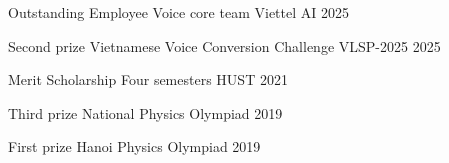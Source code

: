 


\begin{cvhonors}


  \cvhonor
    {Outstanding Employee} %
    {Voice core team} %
    {Viettel AI} %
    {2025} %

  \cvhonor
    {Second prize} %
    {Vietnamese Voice Conversion Challenge} %
    {VLSP-2025} %
    {2025} %

  \cvhonor
    {Merit Scholarship} %
    {Four semesters} %
    {HUST} %
    {2021}

  \cvhonor
    {Third prize} %
    {National Physics Olympiad} %
    {} %
    {2019} %

  \cvhonor
    {First prize} %
    {Hanoi Physics Olympiad} %
    {} %
    {2019} %

\end{cvhonors}
